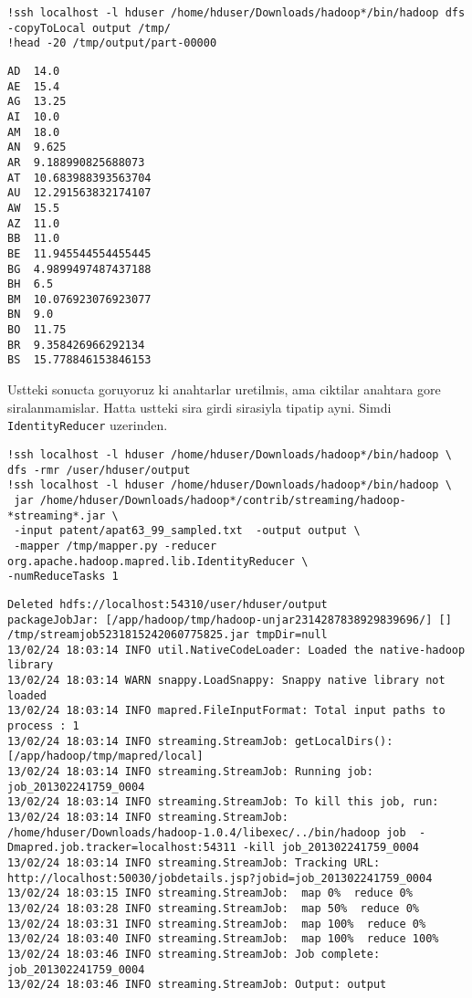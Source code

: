 \documentclass[12pt,fleqn]{article}\usepackage{../common}
\begin{document}
\begin{verbatim}
!ssh localhost -l hduser /home/hduser/Downloads/hadoop*/bin/hadoop dfs  -copyToLocal output /tmp/
!head -20 /tmp/output/part-00000
\end{verbatim}

\begin{verbatim}
AD	14.0
AE	15.4
AG	13.25
AI	10.0
AM	18.0
AN	9.625
AR	9.188990825688073
AT	10.683988393563704
AU	12.291563832174107
AW	15.5
AZ	11.0
BB	11.0
BE	11.945544554455445
BG	4.9899497487437188
BH	6.5
BM	10.076923076923077
BN	9.0
BO	11.75
BR	9.358426966292134
BS	15.778846153846153
\end{verbatim}

Ustteki sonucta goruyoruz ki anahtarlar uretilmis, ama ciktilar
anahtara gore siralanmamislar. Hatta ustteki sira girdi sirasiyla
tipatip ayni. Simdi \verb!IdentityReducer! uzerinden.

\begin{verbatim}
!ssh localhost -l hduser /home/hduser/Downloads/hadoop*/bin/hadoop \
dfs -rmr /user/hduser/output
!ssh localhost -l hduser /home/hduser/Downloads/hadoop*/bin/hadoop \
 jar /home/hduser/Downloads/hadoop*/contrib/streaming/hadoop-*streaming*.jar \
 -input patent/apat63_99_sampled.txt  -output output \
 -mapper /tmp/mapper.py -reducer org.apache.hadoop.mapred.lib.IdentityReducer \
-numReduceTasks 1 
\end{verbatim}

\begin{verbatim}
Deleted hdfs://localhost:54310/user/hduser/output
packageJobJar: [/app/hadoop/tmp/hadoop-unjar2314287838929839696/] [] /tmp/streamjob5231815242060775825.jar tmpDir=null
13/02/24 18:03:14 INFO util.NativeCodeLoader: Loaded the native-hadoop library
13/02/24 18:03:14 WARN snappy.LoadSnappy: Snappy native library not loaded
13/02/24 18:03:14 INFO mapred.FileInputFormat: Total input paths to process : 1
13/02/24 18:03:14 INFO streaming.StreamJob: getLocalDirs(): [/app/hadoop/tmp/mapred/local]
13/02/24 18:03:14 INFO streaming.StreamJob: Running job: job_201302241759_0004
13/02/24 18:03:14 INFO streaming.StreamJob: To kill this job, run:
13/02/24 18:03:14 INFO streaming.StreamJob: /home/hduser/Downloads/hadoop-1.0.4/libexec/../bin/hadoop job  -Dmapred.job.tracker=localhost:54311 -kill job_201302241759_0004
13/02/24 18:03:14 INFO streaming.StreamJob: Tracking URL: http://localhost:50030/jobdetails.jsp?jobid=job_201302241759_0004
13/02/24 18:03:15 INFO streaming.StreamJob:  map 0%  reduce 0%
13/02/24 18:03:28 INFO streaming.StreamJob:  map 50%  reduce 0%
13/02/24 18:03:31 INFO streaming.StreamJob:  map 100%  reduce 0%
13/02/24 18:03:40 INFO streaming.StreamJob:  map 100%  reduce 100%
13/02/24 18:03:46 INFO streaming.StreamJob: Job complete: job_201302241759_0004
13/02/24 18:03:46 INFO streaming.StreamJob: Output: output
\end{verbatim}
\end{document}
